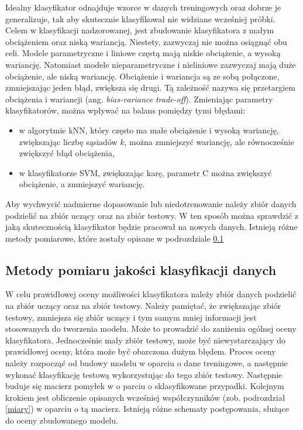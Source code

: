 Idealny klasyfikator odnajduje wzorce w danych treningowych oraz dobrze je generalizuje, tak aby skutecznie klasyfikował nie widziane wcześniej próbki. Celem w klasyfikacji nadzorowanej, jest zbudowanie klasyfikatora z małym obciążeniem oraz niską wariancją. Niestety, zazwyczaj nie można osiągnąć obu celi. Modele parametryczne i liniowe częstą mają niskie obciążenie, a wysoką wariancję. Natomiast modele nieparametryczne i nieliniowe zazwyczaj mają duże obciążenie, ale niską wariancję. Obciążenie i wariancja są ze sobą połączone, zmniejszając jeden błąd, zwiększa się drugi. Tą zależność nazywa się przetargiem obciążenia i wariancji (ang. \textit{bias-variance trade-off}). Zmieniając parametry klasyfikatorów, można wpływać na balans pomiędzy tymi błędami:
\begin{itemize}
	\item w algorytmie kNN, który często ma małe obciążenie i wysoką wariancję, zwiększając liczbę sąsiadów $k$, można zmniejszyć wariancję, ale równocześnie zwiększyć błąd obciążenia,
	\item w klasyfikatorze SVM, zwiększając karę, parametr C można zwiększyć obciążenie, a zmniejszyć wariancję.
\end{itemize}
Aby wychwycić nadmierne dopasowanie lub niedotrenowanie należy zbiór danych podzielić na zbiór uczący oraz na zbiór testowy. W ten sposób można sprawdzić z jaką skutecznością klasyfikator będzie pracował na nowych danych. Istnieją różne metody pomiarowe, które zostały opisane w podrozdziale \ref{testowanieklasyfikatora}
\subsection{Metody pomiaru jakości klasyfikacji danych} \label {testowanieklasyfikatora}
W celu prawidłowej oceny możliwości klasyfikatora należy zbiór danych podzielić na zbiór uczący oraz na zbiór testowy. Należy pamiętać, że zwiększając zbiór testowy, zmniejsza się zbiór uczący i tym samym mniej informacji jest stosowanych do tworzenia modelu. Może to prowadzić do zaniżenia ogólnej oceny klasyfikatora. Jednocześnie mały zbiór testowy, może być niewystarczający do prawidłowej oceny, która może być obarczona dużym błędem. Proces oceny należy rozpocząć od budowy modelu w oparciu o dane treningowe, a następnie wykonać klasyfikację testową wykorzystując do tego zbiór testowy. Następnie buduje się macierz pomyłek w o parciu o sklasyfikowane przypadki. Kolejnym krokiem jest obliczenie opisanych wcześniej współczynników (zob. podrozdział \ref*{miary}) w oparciu o tą macierz. Istnieją różne schematy postępowania, służące do oceny zbudowanego modelu.

